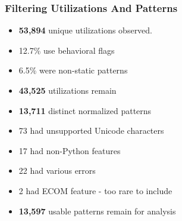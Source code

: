 {
\begin{frame}
\frametitle{Filtering Utilizations And Patterns}
\begin{itemize}
\item [] \textbf{53,894} unique utilizations observed.
\item [] \begin{footnotesize}12.7\% use behavioral flags\end{footnotesize}
\item [] \begin{footnotesize}6.5\% were non-static patterns\end{footnotesize}
\item [] \textbf{43,525} utilizations remain
\item [] \textbf{13,711} distinct normalized patterns
\item [] \begin{footnotesize}73 had unsupported Unicode characters\end{footnotesize}
\item [] \begin{footnotesize}17 had non-Python features\end{footnotesize}
\item [] \begin{footnotesize}22 had various errors\end{footnotesize}
\item [] \begin{footnotesize}2 had ECOM feature - too rare to include\end{footnotesize}
\item [] \textbf{13,597} usable patterns remain for analysis
\end{itemize}
\end{frame}
}
